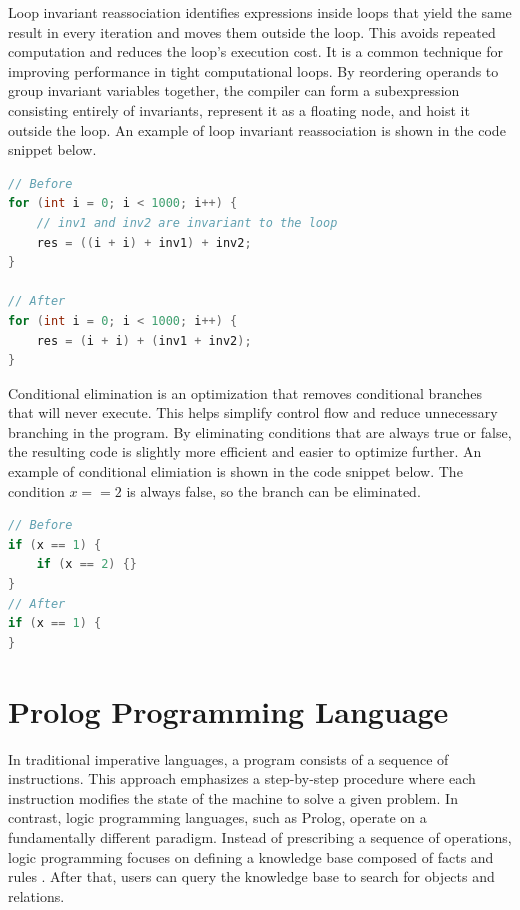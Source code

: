 Loop invariant reassociation identifies expressions inside loops that yield the same result in every iteration and moves them outside the loop. This avoids repeated computation and reduces the loop's execution cost. It is a common technique for improving performance in tight computational loops. By reordering operands to group invariant variables together, the compiler can form a subexpression consisting entirely of invariants, represent it as a floating node, and hoist it outside the loop. An example of loop invariant reassociation is shown in the code snippet below.

\begin{lstlisting}[language=Java]
// Before
for (int i = 0; i < 1000; i++) {
    // inv1 and inv2 are invariant to the loop
    res = ((i + i) + inv1) + inv2;
}

// After
for (int i = 0; i < 1000; i++) {
    res = (i + i) + (inv1 + inv2);
}
\end{lstlisting}

Conditional elimination is an optimization that removes conditional branches that will never execute. This helps simplify control flow and reduce unnecessary branching in the program. By eliminating conditions that are always true or false, the resulting code is slightly more efficient and easier to optimize further. 
An example of conditional elimiation is shown in the code snippet below. The condition \(x == 2\) is always false, so the branch can be eliminated.
\begin{lstlisting}[language=Java]
// Before
if (x == 1) {
    if (x == 2) {}
}
// After
if (x == 1) {
}
\end{lstlisting}

\section{Prolog Programming Language}

In traditional imperative languages, a program consists of a sequence of instructions.
This approach emphasizes a step-by-step procedure where each instruction modifies the state of the machine to solve a given problem. 
In contrast, logic programming languages, such as Prolog, operate on a fundamentally different paradigm. 
Instead of prescribing a sequence of operations, logic programming focuses on defining a knowledge base composed of facts and rules \cite{Bramer2013}. After that, users can query the knowledge base to search for objects and relations. 

